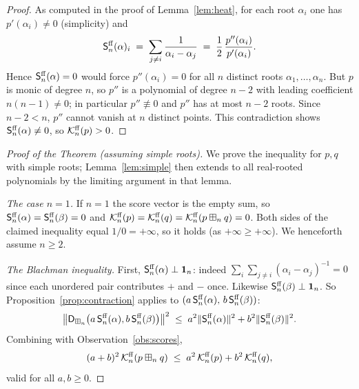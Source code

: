 \begin{proof}
As computed in the proof of Lemma~\ref{lem:heat}, for each root $\alpha_i$ one has
$p'(\alpha_i)\ne0$ (simplicity) and
\[
\mathsf{S}^{\mathrm{ff}}_n(\alpha)_i\;=\;\sum_{j\ne i}\frac{1}{\alpha_i-\alpha_j}
\;=\;\frac{1}{2}\,\frac{p''(\alpha_i)}{p'(\alpha_i)} .
\]
Hence $\mathsf{S}^{\mathrm{ff}}_n(\alpha)=0$ would force $p''(\alpha_i)=0$ for all $n$ distinct
roots $\alpha_1,\dots,\alpha_n$. But $p$ is monic of degree $n$, so $p''$ is a
polynomial of degree $n-2$ with leading coefficient $n(n-1)\ne0$; in particular
$p''\not\equiv0$ and $p''$ has at most $n-2$ roots. Since $n-2<n$, $p''$ cannot
vanish at $n$ distinct points. This contradiction shows $\mathsf{S}^{\mathrm{ff}}_n(\alpha)\ne0$,
so $\mathcal{K}^{\mathrm{ff}}_n(p)>0$.
\end{proof}

\begin{proof}[Proof of the Theorem (assuming simple roots)]
We prove the inequality for $p,q$ with simple roots; Lemma~\ref{lem:simple} then
extends to all real-rooted polynomials by the limiting argument in that lemma.

\smallskip\noindent\textit{The case $n=1$.} If $n=1$ the score vector is the empty
sum, so $\mathsf{S}^{\mathrm{ff}}_n(\alpha)=\mathsf{S}^{\mathrm{ff}}_n(\beta)=0$ and
$\mathcal{K}^{\mathrm{ff}}_n(p)=\mathcal{K}^{\mathrm{ff}}_n(q)=\mathcal{K}^{\mathrm{ff}}_n(p\boxplus_n q)=0$. Both sides of the claimed
inequality equal $1/0=+\infty$, so it holds (as $+\infty\ge+\infty$). We henceforth
assume $n\ge2$.

\smallskip\noindent\textit{The Blachman inequality.}
First, $\mathsf{S}^{\mathrm{ff}}_n(\alpha)\perp\mathbf 1_n$: indeed
$\sum_i\sum_{j\ne i}(\alpha_i-\alpha_j)^{-1}=0$ since each unordered pair
contributes $+$ and $-$ once. Likewise $\mathsf{S}^{\mathrm{ff}}_n(\beta)\perp\mathbf 1_n$. So
Proposition~\ref{prop:contraction} applies to
$(a\,\mathsf{S}^{\mathrm{ff}}_n(\alpha),\,b\,\mathsf{S}^{\mathrm{ff}}_n(\beta))$:
\[
\bigl\|\mathsf{D}_{\boxplus_n}\bigl(a\,\mathsf{S}^{\mathrm{ff}}_n(\alpha),b\,\mathsf{S}^{\mathrm{ff}}_n(\beta)\bigr)\bigr\|^2
\;\le\;a^2\|\mathsf{S}^{\mathrm{ff}}_n(\alpha)\|^2+b^2\|\mathsf{S}^{\mathrm{ff}}_n(\beta)\|^2 .
\]
Combining with Observation~\ref{obs:scores},
\begin{equation}\label{eq:blachman}
(a+b)^2\,\mathcal{K}^{\mathrm{ff}}_n(p\boxplus_n q)\;\le\;a^2\,\mathcal{K}^{\mathrm{ff}}_n(p)+b^2\,\mathcal{K}^{\mathrm{ff}}_n(q),
\end{equation}
valid for all $a,b\ge0$.


\end{proof}
